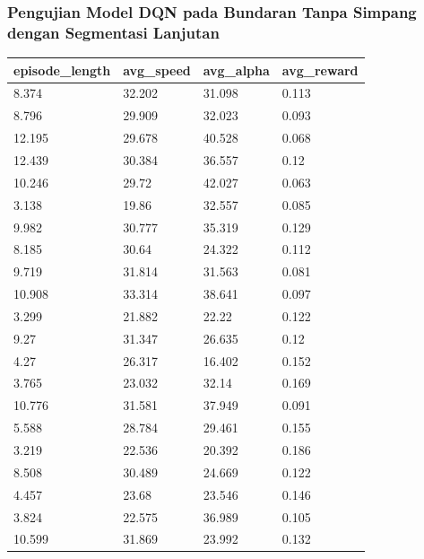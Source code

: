 \documentclass[conference]{IEEEtran}
\begin{document}
	\subsubsection{Pengujian Model DQN pada Bundaran Tanpa Simpang dengan Segmentasi Lanjutan}
	\label{sec:pengujian_dqn_bundaran_nosimpang_segmentasi_hitam_putih}
	
	\begin{table}[H]
		\begin{tabular}{|l|l|l|l|}
			\hline
			episode\_length & avg\_speed  & avg\_alpha  & avg\_reward \\ \hline
			8.374           & 32.202 & 31.098 & 0.113  \\ \hline
			8.796           & 29.909 & 32.023 & 0.093  \\ \hline
			12.195          & 29.678 & 40.528 & 0.068  \\ \hline
			12.439          & 30.384 & 36.557 & 0.12   \\ \hline
			10.246          & 29.72  & 42.027 & 0.063  \\ \hline
			3.138           & 19.86  & 32.557 & 0.085  \\ \hline
			9.982           & 30.777 & 35.319 & 0.129  \\ \hline
			8.185           & 30.64  & 24.322 & 0.112  \\ \hline
			9.719           & 31.814 & 31.563 & 0.081  \\ \hline
			10.908          & 33.314 & 38.641 & 0.097  \\ \hline
			3.299           & 21.882 & 22.22  & 0.122  \\ \hline
			9.27            & 31.347 & 26.635 & 0.12   \\ \hline
			4.27            & 26.317 & 16.402 & 0.152  \\ \hline
			3.765           & 23.032 & 32.14  & 0.169  \\ \hline
			10.776          & 31.581 & 37.949 & 0.091  \\ \hline
			5.588           & 28.784 & 29.461 & 0.155  \\ \hline
			3.219           & 22.536 & 20.392 & 0.186  \\ \hline
			8.508           & 30.489 & 24.669 & 0.122  \\ \hline
			4.457           & 23.68  & 23.546 & 0.146  \\ \hline
			3.824           & 22.575 & 36.989 & 0.105  \\ \hline
			10.599          & 31.869 & 23.992 & 0.132  \\ \hline

\end{tabular}
\end{table}
\end{document}

